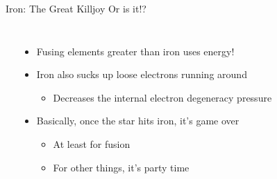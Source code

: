 \documentclass[pdf,aspectratio=169]{beamer}
\begin{document}
\begin{frame}{Iron: The Great Killjoy \scriptsize Or is it!?}
  \begin{columns}
	\begin{center}
	\end{center}
	\begin{itemize}
	  \item Fusing elements greater than iron \alert{uses} energy!
	  \item Iron also sucks up loose electrons running around
		\begin{itemize}
		  \item Decreases the internal electron degeneracy pressure
		\end{itemize}
	  \item Basically, once the star hits iron, it's game over
		\begin{itemize}
		  \item At least for fusion
		  \item For other things, it's party time
		\end{itemize}
	\end{itemize}
  \end{columns}
\end{frame}
\end{document}
